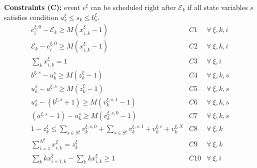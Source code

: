 \documentclass[]{interact}
\theoremstyle{plain}%
\theoremstyle{definition}
\theoremstyle{remark}
\begin{document}
\textbf{Constraints (C):} event $e^{\xi}$ can be scheduled right after $\mathcal{E}_k$ if all state variables $s$ satisfies condition $a^{\xi}_{s}\le s_k\le b^{\xi}_{s}$. 
\begin{eqnarray}
e^{\xi,0}_i-\mathcal{E}_{k} \ge M(x^{\xi}_{i,k}-1)&C1& \forall\ \xi,k,i\\
\mathcal{E}_{k} -e^{\xi,0}_i\ge M(x^{\xi}_{i,k}-1)&C2& \forall\ \xi,k,i\\
\sum_{k} x^{\xi}_{i,k} =1&C3& \forall\ \xi,i\\
b^{\xi,s} - u^s_k \ge M(z^{\xi}_{k}-1)&C4& \forall\ \xi, k,s\\
 u^s_k - a^{\xi,s} \ge M(z^{\xi}_{k}-1)&C5& \forall\ \xi, k,s\\
u^s_k -  (b^{\xi,s}+1) \ge M(v^{\xi,s,1}_k-1) &C6& \forall\ \xi,k,s\\
( a^{\xi,s}-1) - u^s_k \ge M(v^{\xi,s,0}_k-1) &C7& \forall\ \xi,k,s\\
1 - z^{\xi}_{k} \le \sum_{s\in S^{\xi}} v^{\xi,s,0}_k + \sum_{s\in S^{\xi}} v^{\xi,s,1}_k + v^{\xi,r}_k + v^{\xi,N}_k&C8&\forall\ \xi,k\\
\sum_{i=1}^{N^{\xi}}x^{\xi}_{i,k} = z^{\xi}_k&C9&\forall\ \xi,k\\
\sum_{k} kx^{\xi}_{i+1,k} - \sum_{k} kx^{\xi}_{i,k} \ge 1&C10& \forall\ \xi,i
\end{eqnarray}

\end{document}
